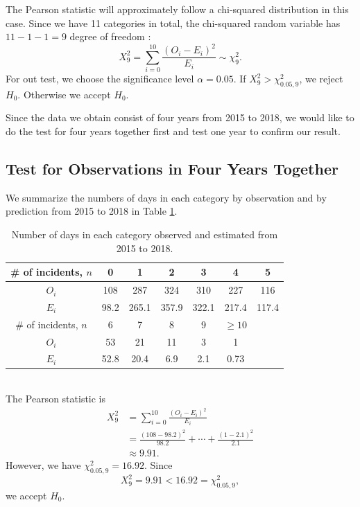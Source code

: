 \documentclass[11pt,a4paper,english]{article}
\begin{document}
The Pearson statistic will approximately follow a chi-squared distribution in this case.
Since we have 11 categories in total, the chi-squared random variable has $11-1-1 = 9$ degree of freedom \cite{slides}:
\begin{equation*}
	X^{2}_{9} = \sum_{i = 0}^{10}
	\frac{(O_{i}-E_{i})^{2}}{E_{i}} \sim \chi_{9}^{2}.
\end{equation*}
For out test, we choose the significance level $\alpha = 0.05$. If $X^{2}_{9} > \chi_{0.05,9}^{2}$, we reject $H_{0}$.
Otherwise we accept $H_{0}$.

Since the data we obtain consist of four years from 2015 to 2018, we would like to do the test for four years together first and test one year to confirm our result. 

\subsection{Test for Observations in Four Years Together}
We summarize the numbers of days in each category by observation and by prediction from 2015 to 2018 in Table \ref{tab:4-years}.
\begin{table}[htbp]
    \centering
	\begin{tabular}{c|cccccc}
		\hline
        \# of incidents, $n$ & 0 & 1 & 2 & 3 & 4 & 5 \\
		\hline
		$O_{i}$ & 108 & 287 & 324 & 310 & 227 & 116\\
		\hline
		$E_{i}$ & 98.2 & 265.1 & 357.9 & 322.1 & 217.4 & 117.4\\ 
		\hline
		\hline
		\# of incidents, $n$ & 6 & 7 & 8 & 9 & $\geq 10$ & \\
		\hline
		$O_{i}$ & 53 & 21 & 11 & 3 & 1 &\\
		\hline
		$E_{i}$  & 52.8 & 20.4 & 6.9 & 2.1 & 0.73 & \\ 
		\hline 
    \end{tabular}
	\caption{Number of days in each category observed and estimated from 2015 to 2018.}
	\label{tab:4-years}
\end{table}
\\The Pearson statistic is
\begin{align*}
	X_{9}^{2} &= \sum_{i = 0}^{10}\frac{(O_{i}-E_{i})^{2}}{E_{i}}\\
	&= \frac{(108-98.2)^{2}}{98.2}+\cdots+\frac{(1-2.1)^{2}}{2.1}\\
	&\approx 9.91.
\end{align*}
However, we have $\chi^{2}_{0.05,9} = 16.92$.
Since 
\begin{equation*}
	X_{9}^{2} = 9.91 < 16.92 = \chi_{0.05,9}^{2},
\end{equation*}
we accept $H_{0}$.
\end{document}
